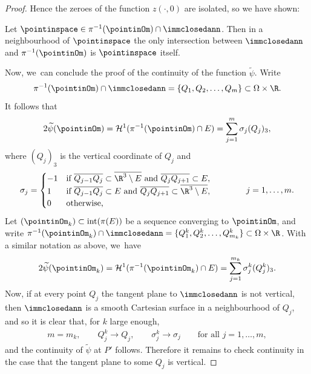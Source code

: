 \begin{proof}
Hence the zeroes of the function $z(\cdot,0)$ are isolated, so we have
shown:

\begin{assertion}\label{assertionA}
Let $\pointinspace\in \pi^{-1}(\pointinOm)\cap
\immclosedann$. Then in a neighbourhood of $\pointinspace$
the only intersection between $\immclosedann$
and $\pi^{-1}(\pointinOm)$ is $\pointinspace$ itself.
\end{assertion}

Now, we~can conclude the proof of
the continuity of the function $\widetilde\psi$.
Write
\[
\pi^{-1}(\pointinOm)\cap
\immclosedann=\{Q_1,Q_2,\dots,Q_{m}\}\subset\Omega\times\R.
\]
It follows that
\begin{align}\label{verticalslice}
2\widetilde\psi(\pointinOm)=\mathcal H^1(\pi^{-1}(\pointinOm)\cap E)=\sum_{j=1}^m\sigma_j (Q_j)_3,
\end{align}
where $(Q_j)_3$ is the vertical coordinate of $Q_j$ and
\begin{align}
\sigma_j=\begin{cases}
-1&\text{if }\overline{Q_{j-1}Q_j}\subset\overline{ \R^3\setminus E}\text{ and }\overline{Q_{j}Q_{j+1}}\subset E,\\
1 &\text{if }\overline{Q_{j-1}Q_j}\subset E\text{ and }\overline{Q_{j}Q_{j+1}}\subset \overline{\R^3\setminus E},\\
0&\text{otherwise,}
\end{cases}
\qquad \qquad j=1,\dots,m.
\end{align}
Let $(\pointinOm_k)
\subset \textup{int}(\pi(E))$ be a sequence converging to $\pointinOm$, and write $\pi^{-1}
(\pointinOm_k )\cap \immclosedann=\{Q^k_1,Q^k_2,\dots,Q^k_{m_k}\}\subset\Omega\times\R$. With a similar
notation as above, we~have
\begin{equation}\label{verticalslice2}
2\widetilde\psi(\pointinOm_k)=\mathcal H^1(\pi^{-1}(\pointinOm_k)
\cap E)=\sum_{j=1}^{m_k}\sigma^k_j (Q^k_j)_3.
\end{equation}
Now, if at
every point $Q_j$ the tangent plane to $\immclosedann$
is not vertical, then $\immclosedann$ is a smooth Cartesian surface in a neighbourhood of
$Q_j$, and so it is clear that, for $k$ large enough,
\begin{align}\label{6.18}
m=m_k,\qquad
Q_j^k\to Q_j,\qquad \sigma^k_j\to\sigma_j\qquad\text{for all }j=1,\dots,m,
\end{align}
and the continuity of $\widetilde \psi$ at $P'$ follows.
Therefore it remains to check continuity in the case that the tangent plane to some $Q_j$ is vertical.


\end{proof}

